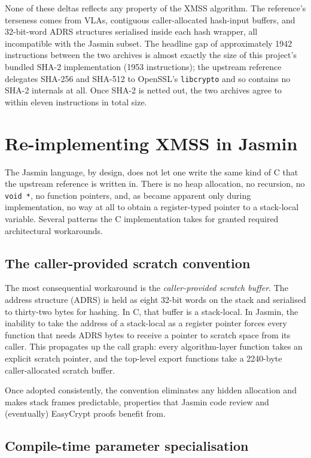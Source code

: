 \documentclass[11pt,a4paper]{article}
\begin{document}
None of these deltas reflects any property of the XMSS algorithm.
The reference's terseness comes from VLAs, contiguous
caller-allocated hash-input buffers, and 32-bit-word ADRS structures
serialised inside each hash wrapper, all incompatible with the
Jasmin subset. The headline gap of approximately 1942 instructions
between the two archives is almost exactly the size of this
project's bundled SHA-2 implementation (1953 instructions); the
upstream reference delegates SHA-256 and SHA-512 to OpenSSL's
\texttt{libcrypto} and so contains no SHA-2 internals at all. Once
SHA-2 is netted out, the two archives agree to within eleven
instructions in total size.

\section{Re-implementing XMSS in Jasmin}

The Jasmin language, by design, does not let one write the same kind
of C that the upstream reference is written in. There is no heap
allocation, no recursion, no \texttt{void *}, no function pointers,
and, as became apparent only during implementation, no way at all
to obtain a register-typed pointer to a stack-local variable.
Several patterns the C implementation takes for granted required
architectural workarounds.

\subsection{The caller-provided scratch convention}

The most consequential workaround is the \emph{caller-provided
scratch buffer}. The address structure (ADRS) is held as eight 32-bit
words on the stack and serialised to thirty-two bytes for hashing.
In C, that buffer is a stack-local. In Jasmin, the inability to take
the address of a stack-local as a register pointer forces every
function that needs ADRS bytes to receive a pointer to scratch space
from its caller. This propagates up the call graph: every
algorithm-layer function takes an explicit scratch pointer, and the
top-level export functions take a 2240-byte caller-allocated scratch
buffer.

Once adopted consistently, the convention eliminates any hidden
allocation and makes stack frames predictable, properties that
Jasmin code review and (eventually) EasyCrypt proofs benefit from.

\subsection{Compile-time parameter specialisation}
\end{document}
